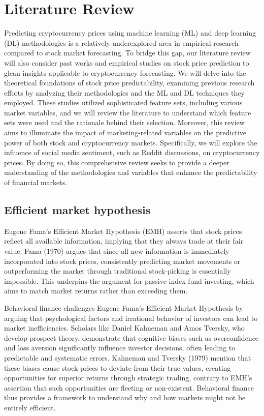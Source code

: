 \chapter*{Literature Review}
\setcounter{chapter}{2}

Predicting cryptocurrency prices using machine learning (ML) and deep learning (DL) methodologies is a relatively underexplored area in empirical research compared to stock market forecasting. To bridge this gap, our literature review will also consider past works and empirical studies on stock price prediction to glean insights applicable to cryptocurrency forecasting.
We will delve into the theoretical foundations of stock price predictability, examining previous research efforts by analyzing their methodologies and the ML and DL techniques they employed. These studies utilized sophisticated feature sets, including various market variables, and we will review the literature to understand which feature sets were used and the rationale behind their selection.
Moreover, this review aims to illuminate the impact of marketing-related variables on the predictive power of both stock and cryptocurrency markets. Specifically, we will explore the influence of social media sentiment, such as Reddit discussions, on cryptocurrency prices. By doing so, this comprehensive review seeks to provide a deeper understanding of the methodologies and variables that enhance the predictability of financial markets.

\section{Efficient market hypothesis}

Eugene Fama's Efficient Market Hypothesis (EMH) asserts that stock prices reflect all available information, implying that they always trade at their fair value. Fama (1970) argues that since all new information is immediately incorporated into stock prices, consistently predicting market movements or outperforming the market through traditional stock-picking is essentially impossible. This underpins the argument for passive index fund investing, which aims to match market returns rather than exceeding them.

Behavioral finance challenges Eugene Fama's Efficient Market Hypothesis by arguing that psychological factors and irrational behavior of investors can lead to market inefficiencies. Scholars like Daniel Kahneman and Amos Tversky, who develop prospect theory, demonstrate that cognitive biases such as overconfidence and loss aversion significantly influence investor decisions, often leading to predictable and systematic errors. Kahneman and Tversky (1979) mention that these biases cause stock prices to deviate from their true values, creating opportunities for superior returns through strategic trading, contrary to EMH’s assertion that such opportunities are fleeting or non-existent. Behavioral finance thus provides a framework to understand why and how markets might not be entirely efficient.

